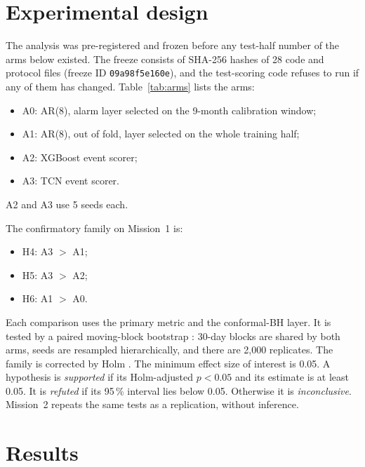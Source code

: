\documentclass[preprint,12pt,authoryear]{elsarticle}
\begin{document}
\section{Experimental design}\label{sec:design}
The analysis was pre-registered and frozen before any test-half number of the arms below
existed. The freeze consists of SHA-256 hashes of 28 code and protocol files
(freeze ID \texttt{09a98f5e160e}), and the test-scoring code refuses to run if any of them
has changed. Table~\ref{tab:arms} lists the arms:
\begin{itemize}
\item A0: AR(8), alarm layer selected on the 9-month calibration window;
\item A1: AR(8), out of fold, layer selected on the whole training half;
\item A2: XGBoost event scorer;
\item A3: TCN event scorer.
\end{itemize}
A2 and A3 use 5 seeds each.

The confirmatory family on Mission~1 is:
\begin{itemize}
\item H4: A3 $>$ A1;
\item H5: A3 $>$ A2;
\item H6: A1 $>$ A0.
\end{itemize}
Each comparison uses the primary metric and the conformal-BH layer. It is tested by a paired
moving-block bootstrap \citep{kunsch1989}: 30-day blocks are shared by both arms, seeds are
resampled hierarchically, and there are 2{,}000 replicates. The family is corrected by Holm
\citep{holm1979}. The minimum effect size of interest is 0.05. A hypothesis is
\emph{supported} if its Holm-adjusted $p<0.05$ and its estimate is at least 0.05. It is
\emph{refuted} if its 95\,\% interval lies below 0.05. Otherwise it is \emph{inconclusive}.
Mission~2 repeats the same tests as a replication, without inference.

\section{Results}\label{sec:results}
\end{document}
